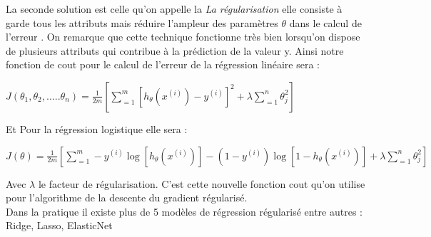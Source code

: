 La seconde solution est celle qu'on appelle la \emph{La régularisation } elle consiste à garde tous les attributs mais réduire l'ampleur des paramètres  $\theta$ dans le calcul de l'erreur . On remarque que cette technique fonctionne très bien lorsqu'on dispose de plusieurs attributs qui contribue à la prédiction de la valeur y.
Ainsi notre fonction de cout pour le calcul de l'erreur de la régression linéaire sera :

\begin{center}
	$J\left({\theta }_{1},{\theta }_{2},.....{\theta }_{n}\right)=\frac{1}{2m}[\sum _{=1}^{m}{\left[{h}_{\theta}\left({x}^{(i)}\right) - {y}^{(i)}\right]}^{2} + {\lambda} \sum _{=1}^{n}{{\theta}_{j}^{2}}]$
\end{center}
Et Pour la régression logistique elle sera :

\begin{center}
	$J\left({\theta }\right)=\frac{1}{2m}[\sum _{=1}^{m}-{y}^{(i)}\log [{h}_{\theta}\left({x}^{(i)}\right)] -(1-{y}^{(i)})\log [1-{h}_{\theta}\left({x}^{(i)}\right)] + {\lambda} \sum _{=1}^{n}{{\theta}_{j}^{2}}]$
\end{center}

Avec $\lambda$ le facteur de régularisation. 
C'est cette nouvelle fonction cout qu'on utilise pour l'algorithme de la descente du gradient régularisé.\\ 
Dans la pratique il existe plus de 5 modèles de régression régularisé entre autres : Ridge, Lasso, ElasticNet